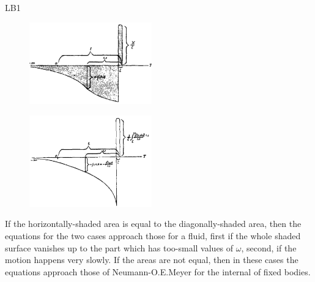 \begin{paper}{LB1}
\begin{figure}
\begin{center}
	\includegraphics[width=150pt]{fig1}
\end{center}
\end{figure}

\begin{figure}
\begin{center}
	\includegraphics[width=150pt]{fig2}
\end{center}
\end{figure}

If the horizontally-shaded area is equal to the diagonally-shaded area, then the equations for the two cases approach those for a  fluid, first if the whole shaded surface vanishes up to the part which has too-small values of $\omega$, second, if the motion happens very slowly. If the areas are not equal, then in these cases the equations approach those of Neumann-O.E.Meyer for the internal  of fixed bodies.


\end{paper}
